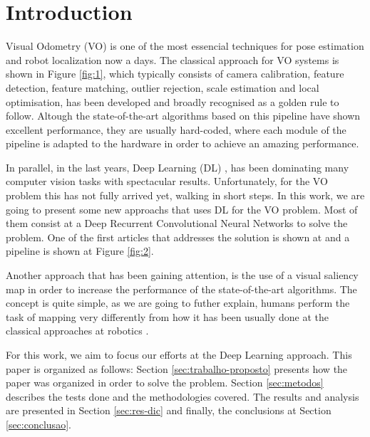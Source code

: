 \section{Introduction}
        Visual Odometry (VO) is one of the most essencial techniques for pose estimation and robot localization now a days. The classical approach for VO systems is shown in Figure \ref{fig:1}, which typically consists of camera calibration, feature detection, feature matching, outlier rejection, scale estimation and local optimisation, has been developed and broadly recognised as a golden rule to follow. Altough the state-of-the-art algorithms based on this pipeline have shown excellent performance, they are usually hard-coded, where each module of the pipeline is adapted to the hardware in order to achieve an amazing performance. 
        
        In parallel, in the last years, Deep Learning (DL) \cite{lecun2015deep}, has been dominating many computer vision tasks with spectacular results. Unfortunately, for the VO problem this has not fully arrived yet, walking in short steps. In this work, we are going to present some new approachs that uses DL for the VO problem. Most of them consist at a Deep Recurrent Convolutional Neural Networks to solve the problem. One of the first articles that addresses the solution is shown at \cite{wang2017deepvo} and a pipeline is shown at Figure \ref{fig:2}.
        
        Another approach that has been gaining attention, is the use of a visual saliency map in order to increase the performance of the state-of-the-art algorithms. The concept is quite simple, as we are going to futher explain, humans perform the task of mapping very differently from how it has been usually done at the classical approaches at robotics \cite{liang2019salientdso}.
        
        For this work, we aim to focus our efforts at the Deep Learning approach. This paper is organized as follows: Section \ref{sec:trabalho-proposto}  presents how the paper was organized in order to solve the problem. Section \ref{sec:metodos} describes the tests done and the methodologies covered. The results and analysis are presented in Section \ref{sec:res-dic} and finally, the conclusions at Section \ref{sec:conclusao}.